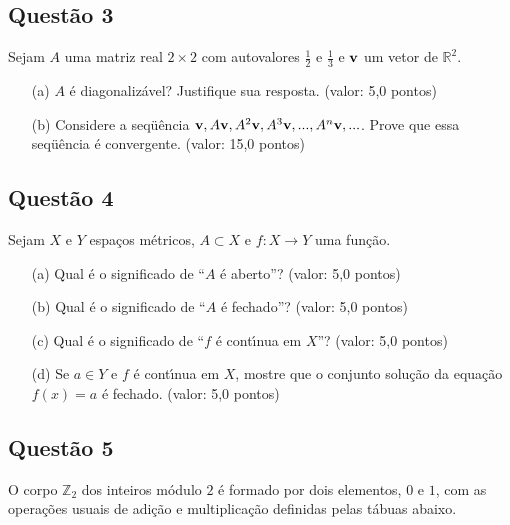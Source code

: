 \documentclass{report}
\begin{document}
\subsection{\color{blue} Quest\~ao 3}

Sejam $A$ uma matriz real $2 \times 2$ com autovalores $\frac1{2}$ e $\frac1{3}$ e $\textbf v$ um vetor de $\mathbb R^2$.

\begin{enumerate}

\item[(a)] $A$ \'e diagonaliz\'avel? Justifique sua resposta. (valor: 5,0 pontos)

\item[(b)] Considere a seqü\^encia $\textbf v , A\textbf v , A^2\textbf v , A^3\textbf v , ... , A^n\textbf v , ... $. Prove que essa seqü\^encia \'e convergente. (valor: 15,0 pontos)

\end{enumerate}

\subsection{\color{blue} Quest\~ao 4}

Sejam $X$ e $Y$ espa\c cos m\'etricos, $A \subset X$ e $f: X \to Y$ uma fun\c c\~ao.

\begin{enumerate}

\item[(a)] Qual \'e o significado de “$A$ \'e aberto”? (valor: 5,0 pontos)

\item[(b)] Qual \'e o significado de “$A$ \'e fechado”? (valor: 5,0 pontos)

\item[(c)] Qual \'e o significado de “$f$ \'e cont\'\i nua em $X$”? (valor: 5,0 pontos)

\item[(d)] Se $a \in Y$ e $f$ \'e cont\'\i nua em $X$, mostre que o conjunto solu\c c\~ao da equa\c c\~ao $f(x) = a$ \'e fechado. (valor: 5,0 pontos)

\end{enumerate}

\subsection{\color{blue} Quest\~ao 5}

O corpo $\mathbb Z_2$ dos inteiros m\'odulo $2$ \'e formado por dois elementos, $0$ e $1$, com as opera\c c\~oes usuais de adi\c c\~ao e multiplica\c c\~ao definidas pelas t\'abuas abaixo.
\end{document}
